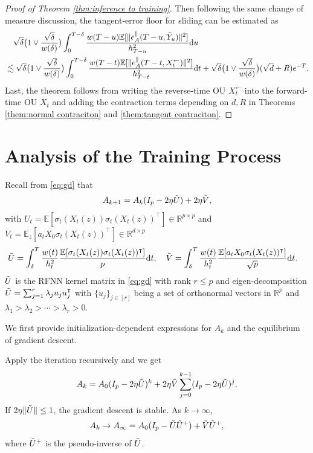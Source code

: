 \documentclass[11pt]{article}
\newcommand{\mb}{\mathbb}
\newcommand{\dee}{\mathrm{d}}
\begin{document}
\begin{proof}[Proof of Theorem \ref{thm:inference to training}]
Then following the same change of measure discussion, the tangent-error floor for sliding can be estimated as
\begin{align*}
    &\quad \sqrt{\delta}  \big(1 \vee \frac{\sqrt{\delta}}{w(\delta)}\big)  \int_0^{T-\delta} \frac{w(T-u)\mb{E}[\| e_A^\parallel(T-u,\Tilde{Y}_u)\|^2]}{h_{T-u}^2} \dee u  \\
    &\lesssim \sqrt{\delta}  \big(1 \vee \frac{\sqrt{\delta}}{w(\delta)}\big) \int_0^{T-\delta} \frac{w(T-t)\mb{E}[\| e_A^\parallel(T-t,X_t^\leftarrow)\|^2]}{h_{T-t}^2}\dee t  +  \sqrt{\delta}  \big(1 \vee \frac{\sqrt{\delta}}{w(\delta)}\big) (\sqrt{d}+R) e^{-T}.
\end{align*}
Last, the theorem follows from writing the reverse-time OU $X_t^\leftarrow$ into the forward-time OU $X_t$ and adding the contraction terms depending on $d,R$ in Theorems \ref{them:normal contraciton} and \ref{them:tangent contraciton}.
\end{proof}
\section{Analysis of the Training Process}\label{append:gradient descent}
Recall from \eqref{eq:gd} that
\begin{align*}
    A_{k+1} = A_k(I_p - 2\eta \Tilde{U}) + 2\eta \Tilde{V} ,
\end{align*}
with $U_t = \mb{E}[ \sigma_t(X_t(z))\sigma_t(X_t(z))^\intercal ]\in \mb{R}^{p\times p}$ and $V_t = \mb{E}_z [ a_t X_0 \sigma_t(X_t(z))^\intercal ]\in \mb{R}^{d\times p}$
\begin{align*}
    \Tilde{U} &= \int_\delta^T \frac{w(t)}{h_t^2} \frac{\mb{E}[\sigma_t(X_t(z))\sigma_t(X_t(z))^\intercal]}{p}\dee t ,\quad \Tilde{V}  = \int_\delta^T \frac{w(t)}{h_t^2} \frac{\mb{E}[a_tX_0\sigma_t(X_t(z))^\intercal]}{\sqrt{p}}\dee t.
\end{align*}
$\Tilde{U}$ is the RFNN kernel matrix in \eqref{eq:gd} with rank $r\le p$ and eigen-decomposition $\Tilde{U}=\sum_{j=1}^r \lambda_j u_j u_j^\intercal$ with $\{u_j\}_{j\in [r]}$ being a set of orthonormal vectors in $\mb{R}^p$ and $\lambda_1>\lambda_2>\cdots>\lambda_r>0$.


We first provide initialization-dependent expressions for $A_k$ and the equilibrium of gradient descent.

Apply the iteration recursively and we get
\begin{align*}
    A_k = A_0(I_p-2\eta \Tilde{U})^k + 2\eta \Tilde{V}\sum_{j=0}^{k-1} (I_p-2\eta \Tilde{U})^j. 
\end{align*}
If $2\eta{\|\Tilde{U}\|}\le 1$, the gradient descent is stable. As $k\to\infty$, 
\begin{align*}
    A_k\to A_\infty = A_0(I_p  - \Tilde{U}\Tilde{U}^+) + \Tilde{V}\Tilde{U}^+,
\end{align*}
where $\Tilde{U}^+$ is the pseudo-inverse of $\Tilde{U}$.
\end{document}
